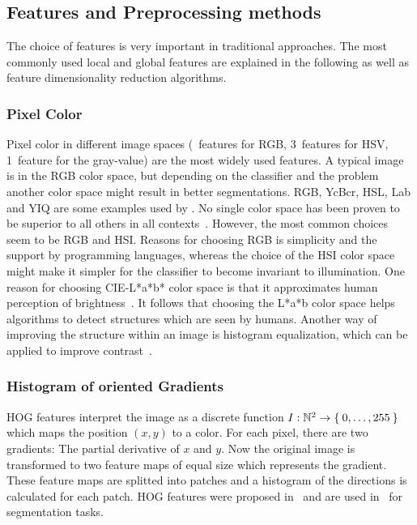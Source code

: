 
\subsection{Features and Preprocessing methods}\label{subsec:features}%
The choice of features is very important in traditional approaches.
The most commonly used local and global features are explained in the following
as well as feature dimensionality reduction algorithms.

\subsubsection{Pixel Color}
Pixel color in different image spaces (~features for RGB, 3~features for
HSV, 1~feature for the gray-value) are the most widely used features. A typical
image is in the RGB color space, but depending on the classifier and the
problem another color space might result in better segmentations. RGB, YcBcr,
HSL, Lab and YIQ are some examples used by \cite{cohen2015memory}. No single
color space has been proven to be superior to all others in all
contexts~\cite{cheng2001color}. However, the most common choices seem to be RGB
and HSI\@. Reasons for choosing RGB is simplicity and the support by
programming languages, whereas the choice of the HSI color space might make it
simpler for the classifier to become invariant to illumination. One reason for
choosing CIE-L*a*b* color space is that it approximates human perception of
brightness~\cite{kasson1992analysis}. It follows that choosing the L*a*b color
space helps algorithms to detect structures which are seen by humans. Another
way of improving the structure within an image is histogram equalization, which
can be applied to improve contrast~\cite{pizer1987adaptive,4228537}.

\subsubsection{Histogram of oriented Gradients}
\Gls{HOG} features interpret the image as a discrete function
$I: \mathbb{N}^2 \rightarrow \Set{0, \dots, 255}$ which maps the position $(x,
y)$ to a color. For each pixel, there are two gradients: The partial derivative
of $x$ and $y$. Now the original image is transformed to two feature maps of
equal size which represents the gradient. These feature maps are splitted into
patches and a histogram of the directions is calculated for each patch.
\gls{HOG} features were proposed in~\cite{1467360} and are used
in~\cite{bourdev2010detecting,felzenszwalb2010object} for segmentation tasks.


